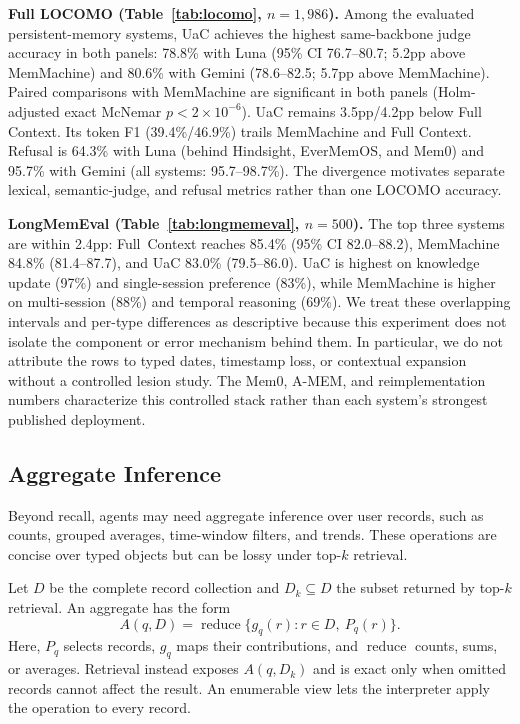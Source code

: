 


\textbf{Full LOCOMO (Table~\ref{tab:locomo}, $n{=}1{,}986$).} Among the evaluated persistent-memory systems, UaC achieves the highest same-backbone judge accuracy in both panels: 78.8\% with Luna (95\% CI 76.7--80.7; 5.2pp above MemMachine) and 80.6\% with Gemini (78.6--82.5; 5.7pp above MemMachine). Paired comparisons with MemMachine are significant in both panels (Holm-adjusted exact McNemar $p{<}2\times10^{-6}$). UaC remains 3.5pp/4.2pp below Full Context. Its token F1 (39.4\%/46.9\%) trails MemMachine and Full Context. Refusal is 64.3\% with Luna (behind Hindsight, EverMemOS, and Mem0) and 95.7\% with Gemini (all systems: 95.7--98.7\%). The divergence motivates separate lexical, semantic-judge, and refusal metrics rather than one LOCOMO accuracy.

\textbf{LongMemEval (Table~\ref{tab:longmemeval}, $n{=}500$).} The top three systems are within 2.4pp: Full~Context reaches 85.4\% (95\% CI 82.0--88.2), MemMachine 84.8\% (81.4--87.7), and UaC 83.0\% (79.5--86.0). UaC is highest on knowledge update (97\%) and single-session preference (83\%), while MemMachine is higher on multi-session (88\%) and temporal reasoning (69\%). We treat these overlapping intervals and per-type differences as descriptive because this experiment does not isolate the component or error mechanism behind them. In particular, we do not attribute the rows to typed dates, timestamp loss, or contextual expansion without a controlled lesion study. The Mem0, A-MEM, and reimplementation numbers characterize this controlled stack rather than each system's strongest published deployment.

\subsection{Aggregate Inference}
\label{sec:analytical}

Beyond recall, agents may need aggregate inference over user records, such as counts, grouped averages, time-window filters, and trends. These operations are concise over typed objects but can be lossy under top-$k$ retrieval.

Let $D$ be the complete record collection and $D_k\subseteq D$ the subset returned by top-$k$ retrieval. An aggregate has the form
\[
A(q,D)=\operatorname{reduce}\{g_q(r):r\in D,\ P_q(r)\}.
\]
Here, $P_q$ selects records, $g_q$ maps their contributions, and $\operatorname{reduce}$ counts, sums, or averages. Retrieval instead exposes $A(q,D_k)$ and is exact only when omitted records cannot affect the result. An enumerable view lets the interpreter apply the operation to every record.

